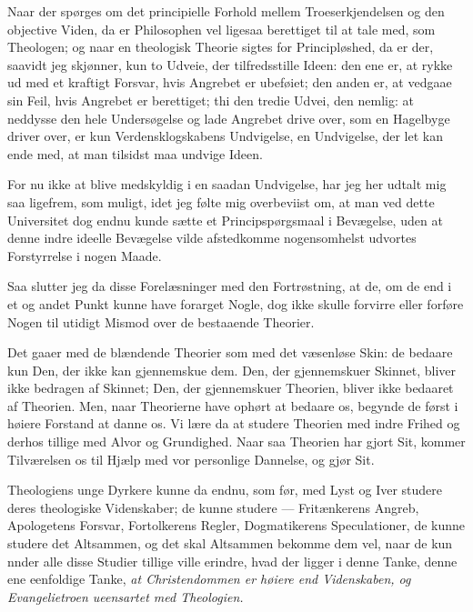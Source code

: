 \documentclass[12pt,a4paper]{book}
\newcommand{\opage}[1]{\marginnote{\footnotesize\textit{[#1]}}}
\begin{document}
Naar der spørges om det principielle Forhold mellem Troeserkjendelsen og den
objective Viden, da er Philosophen vel ligesaa berettiget til at tale med,
som Theologen; og naar en theologisk Theorie sigtes for Principløshed, da er
der, saavidt jeg skjønner, kun to Udveie, der tilfredsstille Ideen: den ene
er, at rykke ud med et kraftigt Forsvar, hvis Angrebet er ubeføiet; den anden
er, at vedgaae sin Feil, hvis Angrebet er berettiget; thi den tredie Udvei,
den nemlig: at neddysse den hele Undersøgelse og lade Angrebet drive over,
som en Hagelbyge driver over, er kun Verdensklogskabens Undvigelse, en
Undvigelse, der let kan ende med, at man tilsidst maa undvige Ideen.

For nu ikke at blive medskyldig i en saadan Undvigelse, har jeg her udtalt
mig saa ligefrem, som muligt, idet jeg følte mig overbeviist om, at man ved
dette Universitet dog endnu kunde sætte et Principspørgsmaal i Bevægelse,
uden at denne indre ideelle Bevægelse vilde afstedkomme nogensomhelst
udvortes Forstyrrelse i nogen Maade.

Saa slutter jeg da disse Forelæsninger med den Fortrøstning, at de, om de end
i et og andet Punkt kunne have forarget Nogle, dog ikke skulle forvirre eller
forføre Nogen til utidigt Mismod over de bestaaende Theorier.

Det gaaer med de blændende Theorier som med det væsenløse Skin: de bedaare
kun Den, der ikke kan gjennemskue dem. Den, der gjennemskuer Skinnet, bliver
ikke bedragen af Skinnet; Den, der gjennemskuer Theorien, bliver ikke
bedaaret af Theorien. Men, naar Theorierne have ophørt at bedaare os, begynde
de først i høiere Forstand at danne os. Vi lære da at studere Theorien med
indre Frihed og derhos tillige med Alvor og Grundighed. Naar saa Theorien har
gjort Sit, kommer Tilværelsen os til Hjælp med vor personlige Dannelse, og
gjør Sit.

\opage{172} Theologiens unge Dyrkere kunne da endnu, som før, med Lyst og Iver studere
deres theologiske Videnskaber; de kunne studere --- Fritænkerens Angreb,
Apologetens Forsvar, Fortolkerens Regler, Dogmatikerens Speculationer, de
kunne studere det Altsammen, og det skal Altsammen bekomme dem vel, naar de
kun nnder alle disse Studier tillige ville erindre, hvad der ligger i denne
Tanke, denne ene eenfoldige Tanke, \emph{at Christendommen er høiere end
Videnskaben, og Evangelietroen ueensartet med Theologien.}
\end{document}
